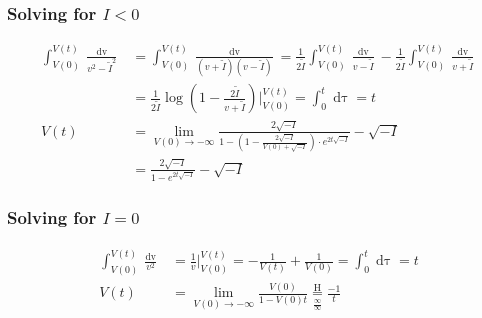 \subsubsection{Solving for \texorpdfstring{$I < 0$}{TEXT}}
\begin{align*}
\int_{V(0)}^{V(t)} \frac{\mathop{dv}}{v^2 - \tilde{I}^2} &= \int_{V(0)}^{V(t)} \frac{\mathop{dv}}{(v+\tilde{I})(v-\tilde{I})} 
= \frac{1}{2 \tilde{I}} \int_{V(0)}^{V(t)} \frac{\mathop{dv}}{v-\tilde{I}}-\frac{1}{2 \tilde{I}} \int_{V(0)}^{V(t)} \frac{\mathop{dv}}{v+\tilde{I}} \\
&= \frac{1}{2 \tilde{I}} \log \left(1-\frac{2 \tilde{I}}{v+\tilde{I}}\right) \Big \rvert_{V(0)}^{V(t)} 
= \int_0^t \mathop{d\tau} = t \\
V(t) &= \lim_{V(0) \rightarrow -\infty} \frac{2 \sqrt{-I}}{1 - \left(1-\frac{2 \sqrt{-I}}{V(0)+\sqrt{-I}}\right)\cdot e^{2 t \sqrt{-I}}}-\sqrt{-I}\\
&= \frac{2 \sqrt{-I}}{1 - e^{2 t \sqrt{-I}}}-\sqrt{-I}
\end{align*}

\subsubsection{Solving for \texorpdfstring{$I = 0$}{TEXT}}
\begin{align*}
\int_{V(0)}^{V(t)} \frac{\mathop{dv}}{v^2} &= \frac{1}{v}\Big\rvert_{V(0)}^{V(t)} = - \frac{1}{V(t)} + \frac{1}{V(0)} = \int_0^t \mathop{d\tau} = t \\
V(t) &= \lim_{V(0) \rightarrow - \infty} \frac{V(0)}{1-V(0)t} \underset{\frac{\infty}{\infty}}{\overset{\mathrm{H}}{=}} \frac{-1}{t}
\end{align*}

